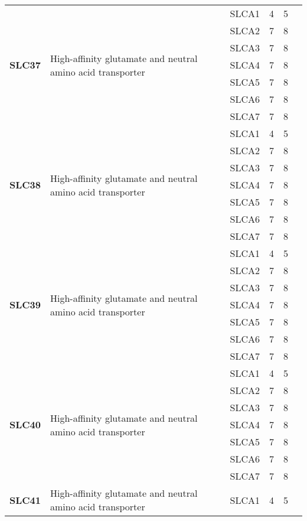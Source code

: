 \documentclass[12pt]{report}
\begin{document}
\begin{center}
\begin{longtable}{|p{1.5cm}|p{3.2cm}|p{1.9cm}|p{1.65cm}|p{3cm}|p{3cm}|}
\hline
\multirow{7}{1.5cm}{\textbf{SLC37}} & \multirow{7}{4cm}{High-affinity glutamate and neutral amino acid transporter} & SLCA1 & 4 & 5\\ 
\cline{3-6}
&&SLCA2&7 & 8&\\ 
\cline{3-6}
&&SLCA3&7 & 8&\\ 
\cline{3-6}
&&SLCA4&7 & 8&\\ 
\cline{3-6}
&&SLCA5&7 & 8&\\ 
\cline{3-6}
&&SLCA6&7 & 8&\\ 
\cline{3-6}
&&SLCA7&7 & 8&\\ 
\hline
\multirow{7}{1.5cm}{\textbf{SLC38}} & \multirow{7}{4cm}{High-affinity glutamate and neutral amino acid transporter} & SLCA1 & 4 & 5\\ 
\cline{3-6}
&&SLCA2&7 & 8&\\ 
\cline{3-6}
&&SLCA3&7 & 8&\\ 
\cline{3-6}
&&SLCA4&7 & 8&\\ 
\cline{3-6}
&&SLCA5&7 & 8&\\ 
\cline{3-6}
&&SLCA6&7 & 8&\\ 
\cline{3-6}
&&SLCA7&7 & 8&\\ 
\hline
\multirow{7}{1.5cm}{\textbf{SLC39}} & \multirow{7}{4cm}{High-affinity glutamate and neutral amino acid transporter} & SLCA1 & 4 & 5\\ 
\cline{3-6}
&&SLCA2&7 & 8&\\ 
\cline{3-6}
&&SLCA3&7 & 8&\\ 
\cline{3-6}
&&SLCA4&7 & 8&\\ 
\cline{3-6}
&&SLCA5&7 & 8&\\ 
\cline{3-6}
&&SLCA6&7 & 8&\\ 
\cline{3-6}
&&SLCA7&7 & 8&\\ 
\hline
\multirow{7}{1.5cm}{\textbf{SLC40}} & \multirow{7}{4cm}{High-affinity glutamate and neutral amino acid transporter} & SLCA1 & 4 & 5\\ 
\cline{3-6}
&&SLCA2&7 & 8&\\ 
\cline{3-6}
&&SLCA3&7 & 8&\\ 
\cline{3-6}
&&SLCA4&7 & 8&\\ 
\cline{3-6}
&&SLCA5&7 & 8&\\ 
\cline{3-6}
&&SLCA6&7 & 8&\\ 
\cline{3-6}
&&SLCA7&7 & 8&\\ 
\hline
\multirow{7}{1.5cm}{\textbf{SLC41}} & \multirow{7}{4cm}{High-affinity glutamate and neutral amino acid transporter} & SLCA1 & 4 & 5\\ 

\end{longtable}
\end{center}
\end{document}
